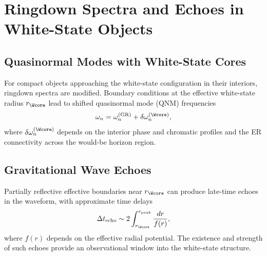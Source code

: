 \chapter{Ringdown Spectra and Echoes in White-State Objects}

\section{Quasinormal Modes with White-State Cores}

For compact objects approaching the white-state configuration in their interiors, ringdown spectra are modified.
Boundary conditions at the effective white-state radius $r_{\Wcore}$ lead to shifted quasinormal mode (QNM) frequencies
\[
\omega_n = \omega_n^{\mathrm{(GR)}} + \delta\omega_n^{(\Wcore)},
\]
where $\delta\omega_n^{(\Wcore)}$ depends on the interior phase and chromatic profiles and the ER connectivity across the would-be horizon region.

\section{Gravitational Wave Echoes}

Partially reflective effective boundaries near $r_{\Wcore}$ can produce late-time echoes in the waveform, with approximate time delays
\[
\Delta t_{\mathrm{echo}} \sim 2\int_{r_{\Wcore}}^{r_{\mathrm{peak}}} \frac{dr}{f(r)},
\]
where $f(r)$ depends on the effective radial potential.
The existence and strength of such echoes provide an observational window into the white-state structure.

